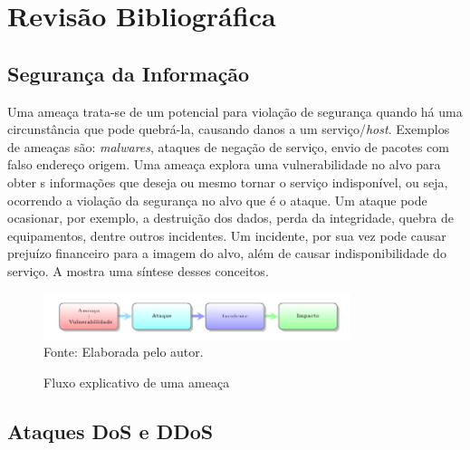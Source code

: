 \chapter[Revisão Bibliográfica]{Revisão Bibliográfica}
\section{Segurança da Informação}
Uma ameaça trata-se de um potencial para violação de segurança quando há uma circunstância que pode quebrá-la, causando danos a um serviço/\textit{host}. Exemplos de ameaças são: \textit{malwares}, ataques de negação de serviço, envio de pacotes com falso endereço origem. Uma ameaça explora uma vulnerabilidade no alvo para obter s informações que deseja ou mesmo tornar o serviço indisponível, ou seja, ocorrendo a violação da segurança no alvo que é o ataque. Um ataque pode ocasionar, por exemplo, a destruição dos dados, perda da integridade, quebra de equipamentos, dentre outros incidentes. Um incidente, por sua vez pode causar prejuízo financeiro para a imagem do alvo, além de causar indisponibilidade do serviço. A  mostra uma síntese desses conceitos.   

 \begin{figure}[ht]
 	\centering
 	\caption{Fluxo explicativo de uma ameaça }
 	\includegraphics[width=0.8\textwidth]{figs/ameacas.pdf}\\
 	{Fonte: Elaborada pelo autor.}
 	\label{fig:ameacas}
 \end{figure}
 
 \section{Ataques DoS e DDoS}

